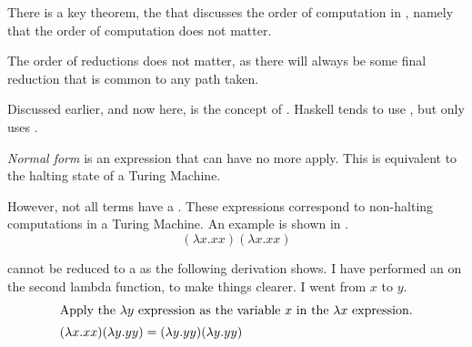 There is a key theorem, the  that discusses the order of computation in , namely that the order of computation does not matter.

\begin{theorem}\label{thm:Church_Rosser_Theorem}
  The order of reductions does not matter, as there will always be some final reduction that is common to any path taken.
\end{theorem}

Discussed earlier, and now here, is the concept of .
Haskell tends to use , but  only uses .
\begin{definition}\label{def:Normal_Form}
  \emph{Normal form} is an expression that can have no more  apply.
  This is equivalent to the halting state of a Turing Machine.
\end{definition}

However, not all terms have a .
These expressions correspond to non-halting computations in a Turing Machine.
An example is shown in .
\begin{equation}\label{eq:No_Normal_Form}
  (\lambda x. x x) (\lambda x. x x)
\end{equation}

 cannot be reduced to a  as the following derivation shows.
I have performed an  on the second lambda function, to make things clearer.
I went from $x$ to $y$.
\begin{align*}
  \intertext{Apply the $\lambda y$ expression as the variable $x$ in the $\lambda x$ expression.}
  (\lambda x. x x) (\lambda y. y y) &= (\lambda y. y y) (\lambda y. y y)
\end{align*}

